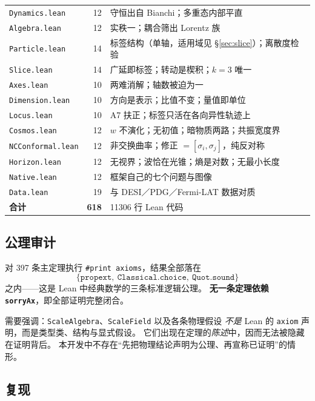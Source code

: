 \documentclass[11pt,a4paper]{article}
\theoremstyle{sudef}
\begin{document}
\begin{center}
\begin{longtable}{lrl}
\texttt{Dynamics.lean}   & 12 & 守恒出自 Bianchi；多重态内部平直 \\
\texttt{Algebra.lean}    & 12 & 实秩一；耦合筛出 Lorentz 族 \\
\texttt{Particle.lean}   & 14 & 标签结构（单轴，适用域见 \S\ref{sec:slice}）；离散度检验 \\
\texttt{Slice.lean}      & 14 & 广延即标签；转动是楔积；$k=3$ 唯一 \\
\texttt{Axes.lean}       & 10 & 两难消解；轴数被迫为一 \\
\texttt{Dimension.lean}  & 10 & 方向是表示；比值不变；量值即单位 \\
\texttt{Locus.lean}      & 10 & A7 扶正；标签只活在各向异性轨迹上 \\
\texttt{Cosmos.lean}     & 12 & $w$ 不演化；无初值；暗物质两路；共振宽度界 \\
\texttt{NCConformal.lean}& 12 & 非交换曲率；修正 $=[\sigma_i,\sigma_j]$，纯反对称 \\
\texttt{Horizon.lean}    & 12 & 无视界；波恰在光锥；熵是对数；无最小长度 \\
\texttt{Native.lean}     & 12 & 框架自己的七个问题与图像 \\
\texttt{Data.lean}       & 19 & 与 DESI／PDG／Fermi-LAT 数据对质 \\
\midrule
\textbf{合计}             & \textbf{618} & 11306 行 Lean 代码 \\
\bottomrule
\end{longtable}
\end{center}

\subsection{公理审计}

对 397 条主定理执行 \texttt{\#print axioms}，结果全部落在
\[
\{\texttt{propext},\ \texttt{Classical.choice},\ \texttt{Quot.sound}\}
\]
之内——这是 Lean 中经典数学的三条标准逻辑公理。
\textbf{无一条定理依赖 \texttt{sorryAx}}，即全部证明完整闭合。

需要强调：\texttt{ScaleAlgebra}、\texttt{ScaleField} 以及各条物理假设
\emph{不是} Lean 的 \texttt{axiom} 声明，而是类型类、结构与显式假设。
它们出现在定理的\emph{陈述}中，因而无法被隐藏在证明背后。
本开发中不存在“先把物理结论声明为公理、再宣称已证明”的情形。

\subsection{复现}
\end{document}
